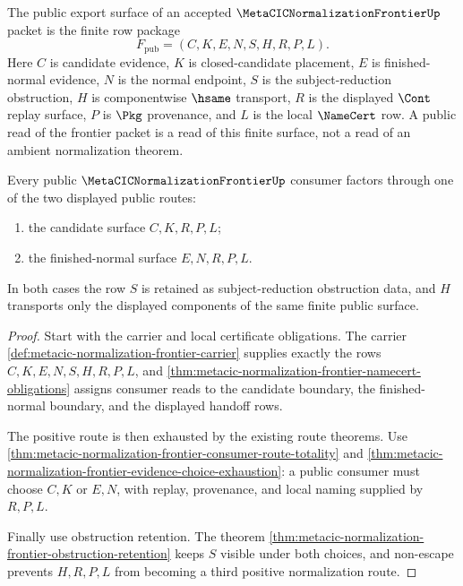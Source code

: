 \begin{definition}
\label{def:metacic-normalization-frontier-public-export-surface}
The public export surface of an accepted
$\MetaCICNormalizationFrontierUp$ packet is the finite row package
$$
F_{\mathrm{pub}}=(C,K,E,N,S,H,R,P,L).
$$
Here $C$ is candidate evidence, $K$ is closed-candidate placement, $E$ is
finished-normal evidence, $N$ is the normal endpoint, $S$ is the
subject-reduction obstruction, $H$ is componentwise $\hsame$ transport, $R$
is the displayed $\Cont$ replay surface, $P$ is $\Pkg$ provenance, and $L$ is
the local $\NameCert$ row. A public read of the frontier packet is a read of
this finite surface, not a read of an ambient normalization theorem.
\end{definition}

\begin{theorem}
\label{thm:metacic-normalization-frontier-public-export-totality}
Every public $\MetaCICNormalizationFrontierUp$ consumer factors through one of
the two displayed public routes:
\begin{enumerate}
\item the candidate surface $C,K,R,P,L$;
\item the finished-normal surface $E,N,R,P,L$.
\end{enumerate}
In both cases the row $S$ is retained as subject-reduction obstruction data,
and $H$ transports only the displayed components of the same finite public
surface.
\end{theorem}
\begin{proof}
Start with the carrier and local certificate obligations. The carrier
\autoref{def:metacic-normalization-frontier-carrier} supplies exactly the
rows $C,K,E,N,S,H,R,P,L$, and
\autoref{thm:metacic-normalization-frontier-namecert-obligations} assigns
consumer reads to the candidate boundary, the finished-normal boundary, and
the displayed handoff rows.

The positive route is then exhausted by the existing route theorems. Use
\autoref{thm:metacic-normalization-frontier-consumer-route-totality} and
\autoref{thm:metacic-normalization-frontier-evidence-choice-exhaustion}: a
public consumer must choose $C,K$ or $E,N$, with replay, provenance, and local
naming supplied by $R,P,L$.

Finally use obstruction retention. The theorem
\autoref{thm:metacic-normalization-frontier-obstruction-retention} keeps $S$
visible under both choices, and non-escape prevents $H,R,P,L$ from becoming a
third positive normalization route.
\end{proof}

